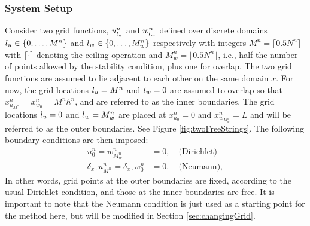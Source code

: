 \subsubsection{System Setup}\label{sec:systSetup}
Consider two grid functions, $u_{l_u}^n$ and $w_{l_w}^n$ defined over discrete domains ${l_u} \in \{0, \hdots, M^n\}$ and ${l_w} \in \{0, \hdots, M_w^n\}$ respectively with integers $M^n = \lceil 0.5N^n\rceil $ with $\lceil \cdot \rceil$ denoting the ceiling operation and $M_w^n = \lfloor 0.5N^n\rfloor$, i.e., half the number of points allowed by the stability condition, plus one for overlap. The two grid functions are assumed to lie adjacent to each other on the same domain $x$. For now, the grid locations ${l_u} = M^n$   and ${l_w} = 0$ are assumed to overlap so that $x_{u_{M^n}}^n = x_{w_0}^n = M^nh^n$, and are referred to as the inner boundaries. The grid locations ${l_u} = 0$ and ${l_w} = M_w^n$ are placed at $x_{u_0}^n = 0$ and $x_{w_{M_w^n}}^n = L$ and will be referred to as the outer boundaries. See Figure \ref{fig:twoFreeStrings}. The following boundary conditions are then imposed:
\begin{subequations}\label{eq:halfStringBoundaryCond}
    \begin{align}
        u_0^n = w_{M_w^n}^n &= 0,\quad \text{(Dirichlet)}\label{eq:halfStringBoundaryCondDirichlet}\\
        \delta_{x\cdot}u_{M^n}^n = \delta_{x\cdot}w_0^n &= 0.\, \quad\text{(Neumann)}, \label{eq:halfStringBoundaryCondNeumann}
    \end{align}
\end{subequations}
 In other words, grid points at the outer boundaries are fixed, according to the usual Dirichlet condition, and those at the inner boundaries are free. \SWcomment[***$\rightarrow$]It is important to note that the Neumann condition is just used as a starting point for the method here, but will be modified in Section \ref{sec:changingGrid}. \SWcomment[$\leftarrow$***]
